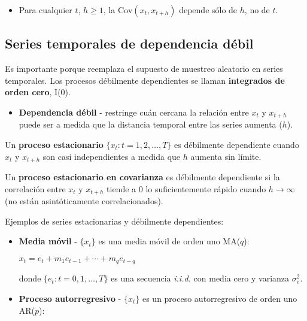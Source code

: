 \documentclass[10pt, a4paper, landscape]{article}
\newcommand{\Cov}{\mathrm{Cov}}
\begin{document}
\begin{multicols}{3}
\begin{itemize}[leftmargin=*]
\begin{itemize}[leftmargin=*]
				\item Para cualquier $t$, $h \geq 1$, la $\Cov(x_{t}, x_{t + h})$ depende sólo de $h$, no de $t$.
			\end{itemize}
		\end{itemize}
		
		\subsection*{Series temporales de dependencia débil}
		
		Es importante porque reemplaza el supuesto de muestreo aleatorio en series temporales. Los procesos débilmente dependientes se llaman \textbf{integrados de orden cero}, I(0).
		
		\begin{itemize}[leftmargin=*]
			\item \textbf{Dependencia débil} - restringe cuán cercana la relación entre $x_{t}$ y $x_{t + h}$ puede ser a medida que la distancia temporal entre las series aumenta ($h$).
		\end{itemize}
		
		Un \textbf{proceso estacionario} $\lbrace x_{t} : t = 1, 2, \ldots, T \rbrace$ es débilmente dependiente cuando $x_{t}$ y $x_{t + h}$ son casi independientes a medida que $h$ aumenta sin límite.
		
		Un \textbf{proceso estacionario en covarianza} es débilmente dependiente si la correlación entre $x_{t}$ y $x_{t + h}$ tiende a $0$ lo suficientemente rápido cuando $h \rightarrow \infty$ (no están asintóticamente correlacionados).
		
		Ejemplos de series estacionarias y débilmente dependientes:
		
		\begin{itemize}[leftmargin=*]
			\item \textbf{Media móvil} - $\lbrace x_{t} \rbrace$ es una media móvil de orden uno MA($q$):
			
			\begin{center}
				$x_{t} = e_{t} + m_{1} e_{t - 1} + \cdots + m_{q} e_{t - q}$
			\end{center}
			
			donde $\lbrace e_{t} : t = 0, 1, \ldots, T \rbrace$ es una secuencia \textsl{i.i.d.} con media cero y varianza $\sigma^{2}_{e}$.
			
			\item \textbf{Proceso autorregresivo} - $\lbrace x_{t} \rbrace$ es un proceso autorregresivo de orden uno AR($p$):
			

\end{itemize}
\end{multicols}
\end{document}
